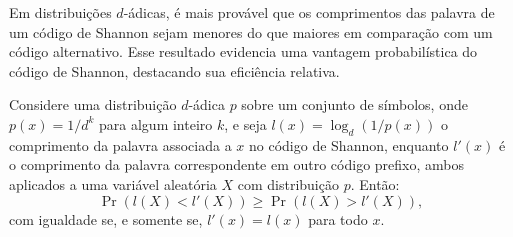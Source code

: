 Em distribuições $d$-ádicas, é mais provável que os comprimentos das palavra de
um código de Shannon sejam menores do que maiores em comparação com um código
alternativo. Esse resultado evidencia uma vantagem probabilística do código de
Shannon, destacando sua eficiência relativa.

\begin{theorem}\label{thm:otcompcodshannon2}
Considere uma distribuição $d$-ádica $p$ sobre um conjunto de símbolos,
onde $p(x) = 1/d^k$ para algum inteiro $k$, e seja $l(x) = \log_d (1/p(x))$
o comprimento da palavra associada a $x$ no código de Shannon, enquanto $l'(x)$
é o comprimento da palavra correspondente em outro código prefixo, ambos
aplicados a uma variável aleatória $X$ com distribuição $p$. Então:
\begin{equation}
\Pr \left( l(X) < l'(X) \right) \geq \Pr \left( l(X) > l'(X) \right),
\end{equation}
com igualdade se, e somente se, $l'(x) = l(x)$ para todo $x$.
\end{theorem}


